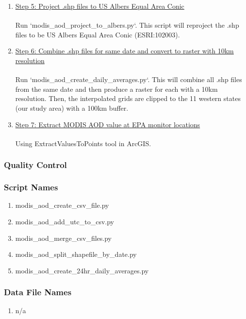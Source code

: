 \begin{enumerate}
\item \underline{Step 5: Project .shp files to US Albers Equal Area Conic}\\\\
Run `modis\_aod\_project\_to\_albers.py`. This script will reproject the .shp files to be US Albers Equal Area Conic (ESRI:102003).

\item \underline{Step 6: Combine .shp files for same date and convert to raster with 10km resolution}\\\\
Run `modis\_aod\_create\_daily\_averages.py`. This will combine all .shp files from the same date and then produce a raster for each with a 10km resolution. Then, the interpolated grids are clipped to the 11 western states (our study area) with a 100km buffer.

\item \underline{Step 7: Extract MODIS AOD value at EPA monitor locations}\\\\
Using ExtractValuesToPoints tool in ArcGIS.

\end{enumerate}

\subsubsection*{Quality Control}

\subsubsection*{Script Names}

\begin{enumerate}
\item modis\_aod\_create\_csv\_file.py
\item modis\_aod\_add\_utc\_to\_csv.py
\item modis\_aod\_merge\_csv\_files.py
\item modis\_aod\_split\_shapefile\_by\_date.py
\item modis\_aod\_create\_24hr\_daily\_averages.py
\end{enumerate}

\subsubsection*{Data File Names}

\begin{enumerate}
\item n/a
\end{enumerate}